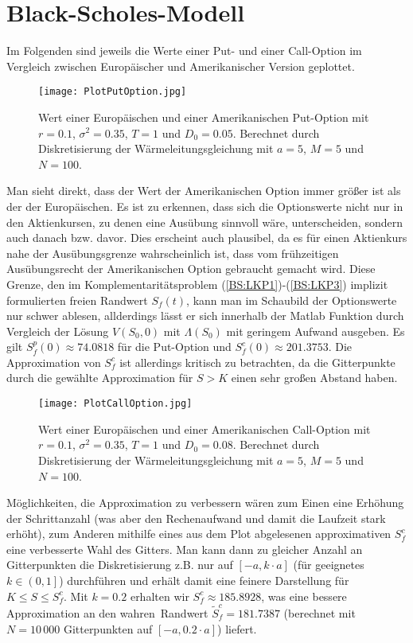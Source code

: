 \newpage
\section{Black-Scholes-Modell}
\label{BSP:BSModell}
Im Folgenden sind jeweils die Werte einer Put- und einer Call-Option im Vergleich zwischen Europäischer und Amerikanischer Version geplottet. 
\begin{figure}[h]
\texttt{[image: PlotPutOption.jpg]}
\caption{Wert einer Europäischen und einer Amerikanischen Put-Option mit $r = 0.1$, $\sigma^2 = 0.35$, $T=1$ und $D_0 = 0.05$. Berechnet durch Diskretisierung der Wärmeleitungsgleichung mit $a=5$, $M=5$ und $N=100$.}
\end{figure}
Man sieht direkt, dass der Wert der Amerikanischen Option immer größer ist als der der Europäischen. Es ist zu erkennen, dass sich die Optionswerte nicht nur in den Aktienkursen, zu denen eine Ausübung sinnvoll wäre, unterscheiden, sondern auch danach bzw. davor. Dies erscheint auch plausibel, da es für einen Aktienkurs nahe der Ausübungsgrenze wahrscheinlich ist, dass vom frühzeitigen Ausübungsrecht der Amerikanischen Option gebraucht gemacht wird. Diese Grenze, den im Komplementaritätsproblem (\ref{BS:LKP1})-(\ref{BS:LKP3}) implizit formulierten freien Randwert $S_f(t)$, kann man im Schaubild der Optionswerte nur schwer ablesen, allderdings lässt er sich innerhalb der Matlab Funktion durch Vergleich der Lösung $V(S_0,0)$ mit $\Lambda(S_0)$ mit geringem Aufwand ausgeben. Es gilt $S_f^p(0)\approx 74.0818$ für die Put-Option und $S_f^c(0) \approx 201.3753$. Die Approximation von $S_f^c$ ist allerdings kritisch zu betrachten, da die Gitterpunkte durch die gewählte Approximation für $S>K$ einen sehr großen Abstand haben. 
\begin{figure}[h]
\texttt{[image: PlotCallOption.jpg]}
\caption{Wert einer Europäischen und einer Amerikanischen Call-Option mit $r = 0.1$, $\sigma^2 = 0.35$, $T=1$ und $D_0 = 0.08$. Berechnet durch Diskretisierung der Wärmeleitungsgleichung mit $a=5$, $M=5$ und $N=100$.}
\end{figure}
Möglichkeiten, die Approximation zu verbessern wären zum Einen eine Erhöhung der Schrittanzahl (was aber den Rechenaufwand und damit die Laufzeit stark erhöht), zum Anderen mithilfe eines aus dem Plot abgelesenen approximativen $S_f^c$ eine verbesserte Wahl des Gitters. Man kann dann zu gleicher Anzahl an Gitterpunkten die Diskretisierung z.B. nur auf $\left[-a,k\cdot a\right]$ (für geeignetes $k\in \left(0,1\right]$) durchführen und erhält damit eine feinere Darstellung für $K\leq S \leq S_f^c$. Mit $k=0.2$ erhalten wir $S_f^c \approx 185.8928$, was eine bessere Approximation an den \glqq wahren\grqq \, Randwert $\tilde S_f^c = 181.7387$ (berechnet mit $N=10\,000$ Gitterpunkten auf $\left[-a,0.2\cdot a\right]$) liefert.

